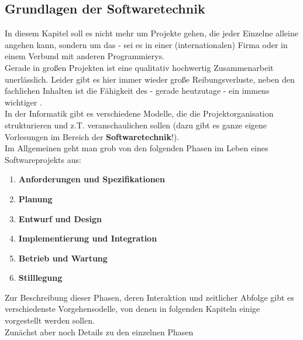 \documentclass{article}
\begin{document}
\subsection{Grundlagen der Softwaretechnik}
In diesem Kapitel soll es nicht mehr um Projekte gehen, die jeder Einzelne alleine angehen kann, sondern um das  - sei es in einer (internationalen) Firma oder  in einem Verbund mit anderen Programmierys. \\
Gerade in großen Projekten ist eine qualitativ hochwertig Zusammenarbeit unerlässlich. Leider gibt es hier immer wieder große Reibungsverluste, neben den fachlichen Inhalten ist die Fähigkeit des  - gerade heutzutage - ein immens wichtiger . \\
In der Informatik gibt es verschiedene Modelle, die die Projektorganisation strukturieren und z.T. veranschaulichen sollen (dazu gibt es ganze eigene Vorlesungen im Bereich der \textbf{Softwaretechnik}!). \\
Im Allgemeinen geht man grob von den folgenden Phasen im Leben eines Softwareprojekts aus:
\begin{enumerate}
    \item \textbf{Anforderungen und Spezifikationen}
    \item \textbf{Planung}
    \item \textbf{Entwurf und Design}
    \item \textbf{Implementierung und Integration}
    \item \textbf{Betrieb und Wartung}
    \item \textbf{Stilllegung}
\end{enumerate}
Zur Beschreibung dieser Phasen, deren Interaktion und zeitlicher Abfolge gibt es verschiedenste Vorgehensodelle, von denen in folgenden Kapiteln einige vorgestellt werden sollen. \\
Zunächst aber noch Details zu den einzelnen Phasen \\
\end{document}
